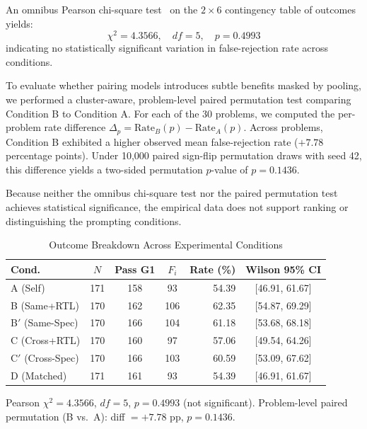 \documentclass[conference]{IEEEtran}
\begin{document}
An omnibus Pearson chi-square test~\cite{pearson1900criterion} on the $2 \times 6$ contingency table of outcomes yields:
\begin{equation}
\chi^2 = 4.3566, \quad df = 5, \quad p = 0.4993
\end{equation}
indicating no statistically significant variation in false-rejection rate across conditions.

To evaluate whether pairing models introduces subtle benefits masked by pooling, we performed a cluster-aware, problem-level paired permutation test comparing Condition B to Condition A. For each of the 30 problems, we computed the per-problem rate difference $\Delta_p = \text{Rate}_B(p) - \text{Rate}_A(p)$. Across problems, Condition B exhibited a higher observed mean false-rejection rate ($+7.78$ percentage points). Under 10,000 paired sign-flip permutation draws with seed 42, this difference yields a two-sided permutation $p$-value of $p = 0.1436$.

Because neither the omnibus chi-square test nor the paired permutation test achieves statistical significance, the empirical data does not support ranking or distinguishing the prompting conditions.

\begin{table}[t]
\centering
\caption{Outcome Breakdown Across Experimental Conditions}
\label{tab:conditions}
\footnotesize
\setlength{\tabcolsep}{3pt}
\begin{tabular}{lcccrc}
\toprule
\textbf{Cond.} & \textbf{$N$} & \textbf{Pass G1} & \textbf{$F_i$} & \textbf{Rate (\%)} & \textbf{Wilson 95\% CI} \\
\midrule
A (Self)         & 171 & 158 & 93  & 54.39 & [46.91, 61.67] \\
B (Same+RTL)     & 170 & 162 & 106 & 62.35 & [54.87, 69.29] \\
B$'$ (Same-Spec) & 170 & 166 & 104 & 61.18 & [53.68, 68.18] \\
C (Cross+RTL)    & 170 & 160 & 97  & 57.06 & [49.54, 64.26] \\
C$'$ (Cross-Spec)& 170 & 166 & 103 & 60.59 & [53.09, 67.62] \\
D (Matched)      & 171 & 161 & 93  & 54.39 & [46.91, 61.67] \\
\bottomrule
\end{tabular}

\vspace{3pt}
\begin{minipage}{0.96\columnwidth}
\scriptsize
Pearson $\chi^2 = 4.3566$, $df = 5$, $p = 0.4993$ (not significant). Problem-level paired permutation (B vs.\ A): diff $= +7.78$ pp, $p = 0.1436$.
\end{minipage}
\end{table}
\end{document}
